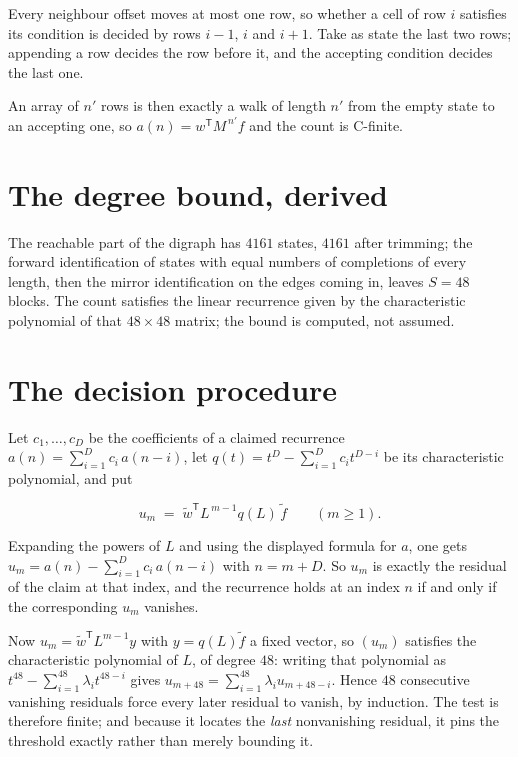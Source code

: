 \documentclass[11pt]{article}
\theoremstyle{definition}
\begin{document}
Every neighbour offset moves at most one row, so whether a cell of row $i$ satisfies its condition is decided by rows $i-1$, $i$ and $i+1$. Take as state the last two rows; appending a row decides the row before it, and the accepting condition decides the last one.

An array of $n'$ rows is then exactly a walk of length $n'$ from the empty state to an accepting one, so $a(n) = w^{\mathsf T}M^{\,n'}f$ and the count is C-finite.

\section{The degree bound, derived}

The reachable part of the digraph has $4161$ states, $4161$ after trimming; the forward identification of states with equal numbers of completions of every length, then the mirror identification on the edges coming in, leaves $S = 48$ blocks. The count satisfies the linear recurrence given by the characteristic polynomial of that $48\times48$ matrix; the bound is computed, not assumed.

\section{The decision procedure}

Let $c_1,\dots,c_D$ be the coefficients of a claimed recurrence $a(n) = \sum_{i=1}^{D} c_i\,a(n-i)$, let $q(t) = t^{D} - \sum_{i=1}^{D} c_i t^{D-i}$ be its characteristic polynomial, and put

\[u_m \;=\; \tilde w^{\mathsf T} L^{\,m-1} q(L)\,\tilde f \qquad (m \ge 1).\]

Expanding the powers of $L$ and using the displayed formula for $a$, one gets $u_m = a(n) - \sum_{i=1}^{D} c_i\,a(n-i)$ with $n = m + D$. So $u_m$ is exactly the residual of the claim at that index, and the recurrence holds at an index $n$ if and only if the corresponding $u_m$ vanishes.

Now $u_m = \tilde w^{\mathsf T} L^{m-1} y$ with $y = q(L)\tilde f$ a fixed vector, so $(u_m)$ satisfies the characteristic polynomial of $L$, of degree $48$: writing that polynomial as $t^{48} - \sum_{i=1}^{48} \lambda_i t^{48-i}$ gives $u_{m+48} = \sum_{i=1}^{48} \lambda_i u_{m+48-i}$. Hence $48$ consecutive vanishing residuals force every later residual to vanish, by induction. The test is therefore finite; and because it locates the {\itshape last} nonvanishing residual, it pins the threshold exactly rather than merely bounding it.
\end{document}
